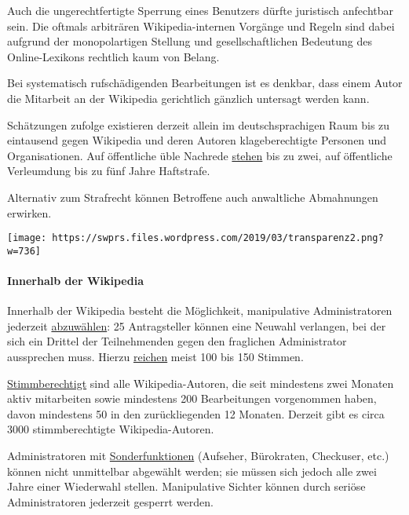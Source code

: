 Auch die ungerechtfertigte Sperrung eines Benutzers dürfte juristisch
anfechtbar sein. Die oftmals arbiträren Wikipedia-internen Vorgänge und
Regeln sind dabei aufgrund der monopol­­artigen Stellung und
gesell­schaft­lichen Bedeutung des Online-Lexikons rechtlich kaum von
Belang.

Bei systematisch rufschädigenden Bearbeitungen ist es denkbar, dass
einem Autor die Mitarbeit an der Wikipedia gerichtlich gänzlich
untersagt werden kann.

Schätzungen zufolge existieren derzeit allein im deutschsprachigen Raum
bis zu eintausend gegen Wikipedia und deren Autoren klageberechtigte
Personen und Organisationen. Auf öffentliche üble Nachrede
\href{https://dejure.org/gesetze/StGB/186.html}{stehen} bis zu zwei, auf
öffentliche Verleumdung bis zu fünf Jahre Haftstrafe.

Alternativ zum Strafrecht können Betroffene auch anwaltliche Abmahnungen
erwirken.

\texttt{[image: https://swprs.files.wordpress.com/2019/03/transparenz2.png?w=736]}

\hypertarget{innerhalb-der-wikipedia}{%
\paragraph{Innerhalb der Wikipedia}\label{innerhalb-der-wikipedia}}

Innerhalb der Wikipedia besteht die Möglichkeit, manipulative
Admini­stra­toren jederzeit
\href{https://de.wikipedia.org/wiki/Wikipedia:Adminwiederwahl}{abzuwählen}:
25 Antragsteller können eine Neuwahl ver­la­ngen, bei der sich ein
Drittel der Teil­neh­menden gegen den fraglichen Admi­ni­strator
aussprechen muss. Hierzu
\href{https://de.wikipedia.org/wiki/Wikipedia:Adminkandidaturen/Archiv/2018}{reichen}
meist 100 bis 150 Stimmen.

\href{https://de.wikipedia.org/wiki/Wikipedia:Stimmberechtigung}{Stimmberechtigt}
sind alle Wikipedia-Autoren, die seit mindestens zwei Monaten aktiv
mitarbeiten sowie mindestens 200 Bearbeitungen vorgenommen haben, davon
mindestens 50 in den zurück­liegenden 12 Monaten. Derzeit gibt es circa
3000 stimmberechtigte Wikipedia-Autoren.

Administratoren mit
\href{https://de.wikipedia.org/wiki/Hilfe:Benutzer}{Sonderfunktionen}
(Aufseher, Bürokraten, Checkuser, etc.) können nicht unmittelbar
abgewählt werden; sie müssen sich jedoch alle zwei Jahre einer
Wiederwahl stellen. Manipulative Sichter können durch seriöse
Administratoren jederzeit gesperrt werden.

